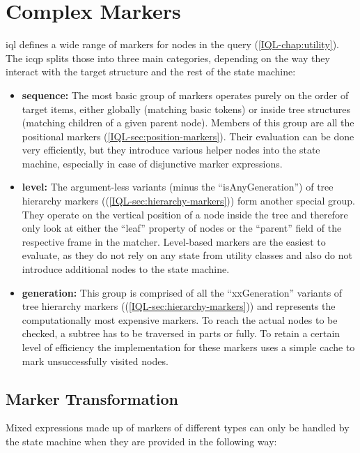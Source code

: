 \documentclass[11pt,a4paper]{report}
\begin{document}
\chapter{Complex Markers}
\label{chap:complex-markers}

\ac{iql} defines a wide range of markers for nodes in the query (\cref{IQL-chap:utility}).
The \ac{icqp} splits those into three main categories, depending on the way they interact with the target structure and the rest of the state machine:
\begin{itemize}
	\item \textbf{sequence:} The most basic group of markers operates purely on the order of target items, either globally (matching basic tokens) or inside tree structures (matching children of a given parent node). 
	Members of this group are all the positional markers (\cref{IQL-sec:position-markers}).
	Their evaluation can be done very efficiently, but they introduce various helper nodes into the state machine, especially in case of disjunctive marker expressions. 
	\item \textbf{level:} The argument-less variants (minus the ``isAnyGeneration'') of tree hierarchy markers ((\cref{IQL-sec:hierarchy-markers})) form another special group.
	They operate on the vertical position of a node inside the tree and therefore only look at either the ``leaf'' property of nodes or the ``parent'' field of the respective frame in the matcher.
	Level-based markers are the easiest to evaluate, as they do not rely on any state from utility classes and also do not introduce additional nodes to the state machine.
	\item \textbf{generation:} This group is comprised of all the ``xxGeneration'' variants of tree hierarchy markers ((\cref{IQL-sec:hierarchy-markers})) and represents the computationally most expensive markers.
	To reach the actual nodes to be checked, a subtree has to be traversed in parts or fully.
	To retain a certain level of efficiency the implementation for these markers uses a simple cache to mark unsuccessfully visited nodes.
\end{itemize}

\section{Marker Transformation}
\label{sec:marker-transformation}

Mixed expressions made up of markers of different types can only be handled by the state machine when they are provided in the following way:
\end{document}
